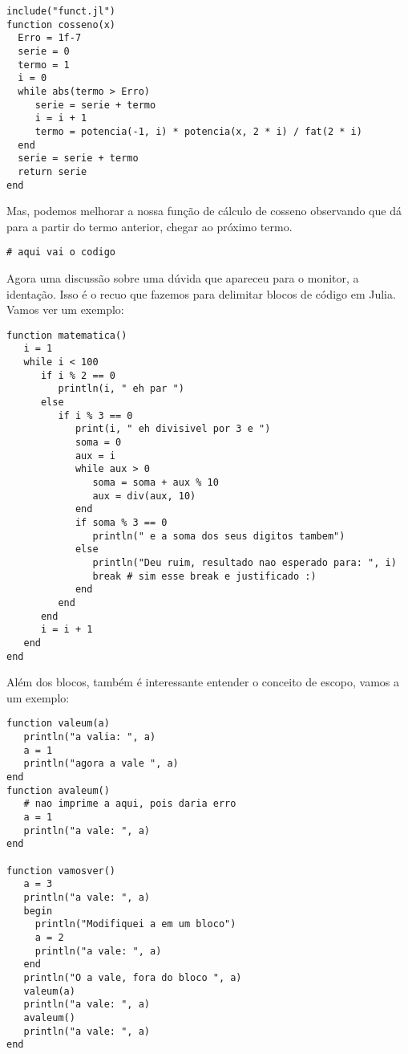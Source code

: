 \documentclass[a4paper]{article}
\begin{document}
\lstset{language=ein-julia,label= ,caption= ,captionpos=b,numbers=none}
\begin{lstlisting}
include("funct.jl")
function cosseno(x)
  Erro = 1f-7
  serie = 0
  termo = 1
  i = 0
  while abs(termo > Erro)
     serie = serie + termo
     i = i + 1
     termo = potencia(-1, i) * potencia(x, 2 * i) / fat(2 * i)
  end
  serie = serie + termo
  return serie
end
\end{lstlisting}

Mas, podemos melhorar a nossa função de cálculo de cosseno observando que
dá para a partir do termo anterior, chegar ao próximo termo.


\lstset{language=ein-julia,label= ,caption= ,captionpos=b,numbers=none}
\begin{lstlisting}
# aqui vai o codigo
\end{lstlisting}

Agora uma discussão sobre uma dúvida que apareceu para o monitor, a identação. Isso
é o recuo que fazemos para delimitar blocos de código em Julia. Vamos ver um exemplo:

\lstset{language=ein-julia,label= ,caption= ,captionpos=b,numbers=none}
\begin{lstlisting}
function matematica()
   i = 1
   while i < 100
      if i % 2 == 0
         println(i, " eh par ")
      else
         if i % 3 == 0
            print(i, " eh divisivel por 3 e ")
            soma = 0
            aux = i
            while aux > 0
               soma = soma + aux % 10
               aux = div(aux, 10)
            end
            if soma % 3 == 0
               println(" e a soma dos seus digitos tambem")
            else
               println("Deu ruim, resultado nao esperado para: ", i)
               break # sim esse break e justificado :)
            end
         end
      end
      i = i + 1
   end
end
\end{lstlisting}

Além dos blocos, também é interessante entender o conceito de escopo, vamos a um exemplo:

\lstset{language=ein-julia,label= ,caption= ,captionpos=b,numbers=none}
\begin{lstlisting}
function valeum(a)
   println("a valia: ", a)
   a = 1
   println("agora a vale ", a)
end
function avaleum()
   # nao imprime a aqui, pois daria erro
   a = 1
   println("a vale: ", a)
end

function vamosver()
   a = 3
   println("a vale: ", a)
   begin
     println("Modifiquei a em um bloco")
     a = 2
     println("a vale: ", a)
   end
   println("O a vale, fora do bloco ", a)
   valeum(a)
   println("a vale: ", a)
   avaleum()
   println("a vale: ", a)
end
\end{lstlisting}
\end{document}
